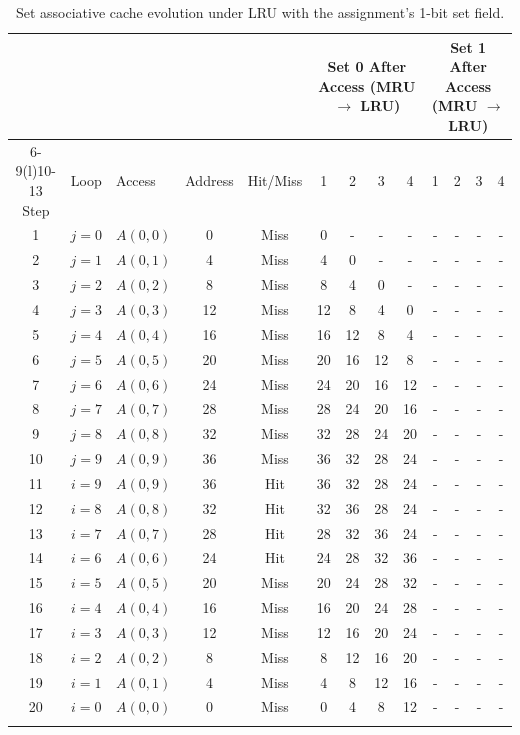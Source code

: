 \documentclass{article}
\begin{document}
\scriptsize
\setlength{\tabcolsep}{3.5pt}
\begin{longtable}{@{}cclcc*{8}{c}@{}}
\toprule
& & & & & \multicolumn{4}{c}{Set 0 After Access (MRU $\rightarrow$ LRU)} & \multicolumn{4}{c}{Set 1 After Access (MRU $\rightarrow$ LRU)} \\
\cmidrule(l){6-9}\cmidrule(l){10-13}
Step & Loop & Access & Address & Hit/Miss & 1 & 2 & 3 & 4 & 1 & 2 & 3 & 4 \\
\midrule
\endhead
1 & $j=0$ & $A(0,0)$ & 0 & Miss & 0 & - & - & - & - & - & - & - \\
2 & $j=1$ & $A(0,1)$ & 4 & Miss & 4 & 0 & - & - & - & - & - & - \\
3 & $j=2$ & $A(0,2)$ & 8 & Miss & 8 & 4 & 0 & - & - & - & - & - \\
4 & $j=3$ & $A(0,3)$ & 12 & Miss & 12 & 8 & 4 & 0 & - & - & - & - \\
5 & $j=4$ & $A(0,4)$ & 16 & Miss & 16 & 12 & 8 & 4 & - & - & - & - \\
6 & $j=5$ & $A(0,5)$ & 20 & Miss & 20 & 16 & 12 & 8 & - & - & - & - \\
7 & $j=6$ & $A(0,6)$ & 24 & Miss & 24 & 20 & 16 & 12 & - & - & - & - \\
8 & $j=7$ & $A(0,7)$ & 28 & Miss & 28 & 24 & 20 & 16 & - & - & - & - \\
9 & $j=8$ & $A(0,8)$ & 32 & Miss & 32 & 28 & 24 & 20 & - & - & - & - \\
10 & $j=9$ & $A(0,9)$ & 36 & Miss & 36 & 32 & 28 & 24 & - & - & - & - \\
11 & $i=9$ & $A(0,9)$ & 36 & Hit & 36 & 32 & 28 & 24 & - & - & - & - \\
12 & $i=8$ & $A(0,8)$ & 32 & Hit & 32 & 36 & 28 & 24 & - & - & - & - \\
13 & $i=7$ & $A(0,7)$ & 28 & Hit & 28 & 32 & 36 & 24 & - & - & - & - \\
14 & $i=6$ & $A(0,6)$ & 24 & Hit & 24 & 28 & 32 & 36 & - & - & - & - \\
15 & $i=5$ & $A(0,5)$ & 20 & Miss & 20 & 24 & 28 & 32 & - & - & - & - \\
16 & $i=4$ & $A(0,4)$ & 16 & Miss & 16 & 20 & 24 & 28 & - & - & - & - \\
17 & $i=3$ & $A(0,3)$ & 12 & Miss & 12 & 16 & 20 & 24 & - & - & - & - \\
18 & $i=2$ & $A(0,2)$ & 8 & Miss & 8 & 12 & 16 & 20 & - & - & - & - \\
19 & $i=1$ & $A(0,1)$ & 4 & Miss & 4 & 8 & 12 & 16 & - & - & - & - \\
20 & $i=0$ & $A(0,0)$ & 0 & Miss & 0 & 4 & 8 & 12 & - & - & - & - \\
\bottomrule
\caption{Set associative cache evolution under LRU with the assignment's 1-bit set field.}
\end{longtable}
\normalsize
\end{document}
